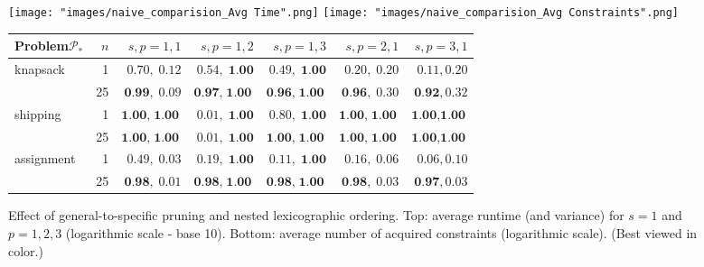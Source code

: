 \documentclass{article}
\newcommand{\program}{\ensuremath{\mathcal{P}}\xspace}
\renewcommand\[{\begin{equation}}
\renewcommand\]{\end{equation}}
\begin{document}
\begin{figure*}
\centering
\begin{minipage}{0.25\linewidth}
\centering
\texttt{[image: "images/naive\_comparision\_Avg Time".png]}
 \texttt{[image: "images/naive\_comparision\_Avg Constraints".png]}
\caption{\label{fig:results}  Effect of general-to-specific pruning and
    nested lexicographic ordering.  Top: average runtime (and variance) for
    $s=1$ and $p = 1, 2, 3$ (logarithmic scale - base 10).  Bottom: average number of
    acquired constraints (logarithmic scale).  (Best viewed in color.)}
\end{minipage}
\hspace{0.3 cm}
\begin{minipage}{0.70\linewidth}
\centering
\captionsetup{type=table} %
    \begin{small}
    \begin{tabular}{l|r|r|rr|rr}
        \textbf{Problem}\;$\program_*$  & $n$   & $s,p=1,1$   & $s,p=1,2$       & $s,p=1,3$           & $s,p=2,1$       & $s,p=3,1$       \\
        \toprule
        knapsack                        & 1     & $0.70,\; 0.12$  & $0.54, \; \textbf{1.00}$ & $0.49, \; \textbf{1.00}$  & $0.20, \; 0.20$   & $0.11, 0.20$  \\
                                        & 25    & $\textbf{0.99},\; 0.09$  & $\textbf{0.97}, \; \textbf{1.00}$ & $\textbf{0.96}, \; \textbf{1.00}$  & $\textbf{0.96}, \; 0.30$   & $\textbf{0.92}, 0.32$  \\
        \midrule
        shipping                        & 1     & $\textbf{1.00},\; \textbf{1.00}$  & $0.01, \; \textbf{1.00}$ & $0.80, \; \textbf{1.00}$  & $\textbf{1.00}, \; \textbf{1.00}$   & $\textbf{1.00}, \textbf{1.00}$  \\
                                        & 25    & $\textbf{1.00},\; \textbf{1.00}$  & $0.01, \; \textbf{1.00}$ & $\textbf{1.00}, \; \textbf{1.00}$  & $\textbf{1.00}, \; \textbf{1.00}$   & $\textbf{1.00}, \textbf{1.00}$  \\
        \midrule
        assignment                      & 1     & $0.49,\; 0.03$  & $0.19, \; \textbf{1.00}$ & $0.11, \; \textbf{1.00}$  & $0.16, \; 0.06$   & $0.06, 0.10$  \\
                                        & 25    & $\textbf{0.98},\; 0.01$  & $\textbf{0.98}, \; \textbf{1.00}$ & $\textbf{0.98}, \; \textbf{1.00}$  & $\textbf{0.98}, \; 0.03$   & $\textbf{0.97}, 0.03$  \\

\end{tabular}
\end{small}
\end{minipage}
\end{figure*}
\end{document}
